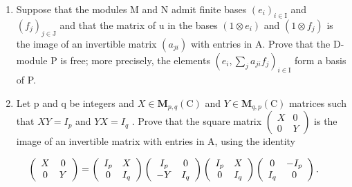 \begin{enumerate}
\def\labelenumi{\alph{enumi})}
\item
  Suppose that the modules M and N admit finite bases \((e_{i})_{i\in\mathrm{I}}\) and \((f_{j})_{j\in\mathrm{J}}\) and that the matrix of u in the bases \((1\otimes e_{i})\) and \((1\otimes f_{j})\) is the image of an invertible matrix \((a_{ji})\) with entries in A. Prove that the D-module P is free; more precisely, the elements \((e_{i},\sum_{j}a_{ji}f_{j})_{i\in\mathrm{I}}\) form a basis of P.
\item
  Let p and q be integers and \(X \in \mathbf{M}_{p,q}(\mathrm{C})\) and \(Y \in \mathbf{M}_{q,p}(\mathrm{C})\) matrices such that \(XY = I_{p}\) and \(YX = I_{q}\) . Prove that the square matrix \(\begin{pmatrix} X & 0 \\ 0 & Y \end{pmatrix}\) is the image of an invertible matrix with entries in A, using the identity
\end{enumerate}

\[
\left( \begin{array}{c c} X & 0 \\ 0 & Y \end{array} \right) = \left( \begin{array}{c c} I _ {p} & X \\ 0 & I _ {q} \end{array} \right) \left( \begin{array}{c c} I _ {p} & 0 \\ - Y & I _ {q} \end{array} \right) \left( \begin{array}{c c} I _ {p} & X \\ 0 & I _ {q} \end{array} \right) \left( \begin{array}{c c} 0 & - I _ {p} \\ I _ {q} & 0 \end{array} \right).
\]


